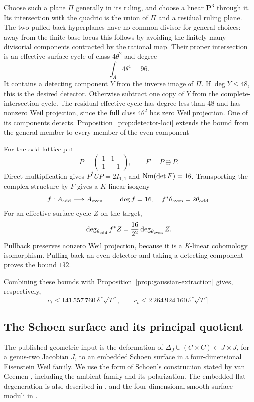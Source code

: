 Choose such a plane $\Pi$ generally in its ruling, and choose a linear $\mathbf P^3$ through it. Its intersection with the quadric is the union of $\Pi$ and a residual ruling plane. The two pulled-back hyperplanes have no common divisor for general choices: away from the finite base locus this follows by avoiding the finitely many divisorial components contracted by the rational map. Their proper intersection is an effective surface cycle of class $4\theta^2$ and degree
\[
 \int_A4\theta^4=96.
\]
It contains a detecting component $Y$ from the inverse image of $\Pi$. If $\deg Y\leq48$, this is the desired detector. Otherwise subtract one copy of $Y$ from the complete-intersection cycle. The residual effective cycle has degree less than $48$ and has nonzero Weil projection, since the full class $4\theta^2$ has zero Weil projection. One of its components detects. Proposition~\ref{prop:detector-loci} extends the bound from the general member to every member of the even component.

For the odd lattice put
\[
 P=\begin{pmatrix}1&1\\1&-1\end{pmatrix},\qquad F=P\oplus P.
\]
Direct multiplication gives $P^*UP=2I_{1,1}$ and $\operatorname{Nm}(\det F)=16$. Transporting the complex structure by $F$ gives a $K$-linear isogeny
\[
 f:A_{\rm odd}\longrightarrow A_{\rm even},\qquad
 \deg f=16,\quad f^*\theta_{\rm even}=2\theta_{\rm odd}.
\]
For an effective surface cycle $Z$ on the target,
\[
 \deg_{\theta_{\rm odd}} f^*Z
 =\frac{16}{2^2}\deg_{\theta_{\rm even}}Z.
\]
Pullback preserves nonzero Weil projection, because it is a $K$-linear cohomology isomorphism. Pulling back an even detector and taking a detecting component proves the bound $192$.

Combining these bounds with Proposition~\ref{prop:gaussian-extraction} gives, respectively,
\[
 c_t\leq141\,557\,760\,\delta\lceil\sqrt T\rceil,
 \qquad
 c_t\leq2\,264\,924\,160\,\delta\lceil\sqrt T\rceil.
\]

\subsection{The Schoen surface and its principal quotient}

The published geometric input is the deformation of
$\Delta_J\cup(C\times C)\subset J\times J$, for a genus-two Jacobian $J$, to an embedded Schoen surface in a four-dimensional Eisenstein Weil family. We use the form of Schoen's construction \cite{Schoen07} stated by van Geemen \cite[Introduction, p.~1, and \S6.2, pp.~14--15]{vG22}, including the ambient family and its polarization. The embedded flat degeneration is also described in \cite[\S3, pp.~5--6]{Beauville}, and the four-dimensional smooth surface moduli in \cite[Theorem~1]{RRS}.


